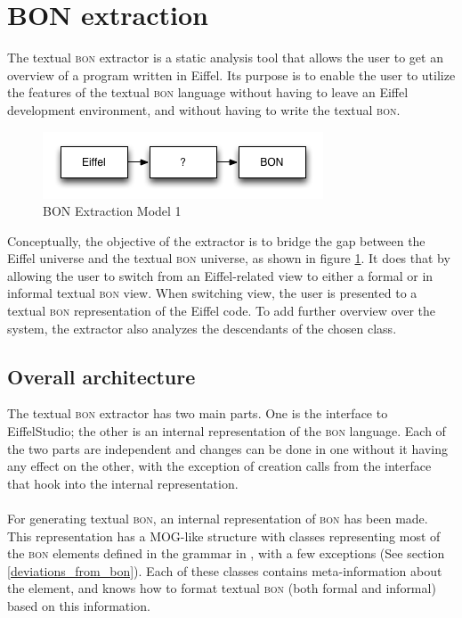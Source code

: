\section{BON extraction}
The textual \textsc{bon} extractor is a static analysis tool that allows the user to get an overview of a program written in Eiffel. Its purpose is to enable the user to utilize the features of the textual \textsc{bon} language without having to leave an Eiffel development environment, and without having to write the textual \textsc{bon}.
\begin{figure}[H]
\centering
\includegraphics[scale=0.8]{images/BON-extraction-model-1.png}
\caption{BON Extraction Model 1}
\label{fig:bon_extraction_1}
\end{figure}
\label{design-bon-extraction}
Conceptually, the objective of the extractor is to bridge the gap between the Eiffel universe and the textual \textsc{bon} universe, as shown in figure \ref{fig:bon_extraction_1}. It does that by allowing the user to switch from an Eiffel-related view to either a formal or in informal textual \textsc{bon} view. When switching view, the user is presented to a textual \textsc{bon} representation of the Eiffel code. To add further overview over the system, the extractor also analyzes the descendants of the chosen class.

\subsection{Overall architecture}
The textual \textsc{bon} extractor has two main parts. One is the interface to EiffelStudio; the other is an internal representation of the \textsc{bon} language. Each of the two parts are independent and changes can be done in one without it having any effect on the other, with the exception of creation calls from the interface that hook into the internal representation.

\paragraph{}
For generating textual \textsc{bon},  an internal representation of \textsc{bon} has been made. This representation has a MOG-like structure with classes representing most of the \textsc{bon} elements defined in the grammar in \cite{walden1995}, with a few exceptions (See section \ref{deviations_from_bon}).  Each of these classes contains meta-information about the element, and knows how to format textual \textsc{bon} (both formal and informal) based on this information.

